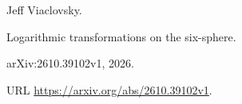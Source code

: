 Jeff Viaclovsky.

\newblock Logarithmic transformations on the six-sphere.

\newblock arXiv:2610.39102v1, 2026{}.

\newblock URL \url{https://arxiv.org/abs/2610.39102v1}.
